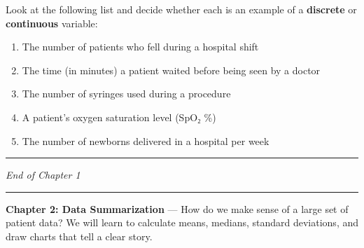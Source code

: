 \documentclass[
  12pt,
  letterpaper,
]{book}
\providecommand{\tightlist}{%
  \setlength{\itemsep}{0pt}\setlength{\parskip}{0pt}}
\begin{document}
\begin{tcolorbox}[enhanced jigsaw, arc=.35mm, bottomrule=.15mm, bottomtitle=1mm, breakable, colback=white, colbacktitle=quarto-callout-caution-color!10!white, colframe=quarto-callout-caution-color-frame, coltitle=black, left=2mm, leftrule=.75mm, opacityback=0, opacitybacktitle=0.6, rightrule=.15mm, title={✏️ Exercise 3}, titlerule=0mm, toprule=.15mm, toptitle=1mm]

Look at the following list and decide whether each is an example of a
\textbf{discrete} or \textbf{continuous} variable:

\begin{enumerate}
\def\labelenumi{\arabic{enumi}.}
\tightlist
\item
  The number of patients who fell during a hospital shift
\item
  The time (in minutes) a patient waited before being seen by a doctor
\item
  The number of syringes used during a procedure
\item
  A patient's oxygen saturation level (SpO₂ \%)
\item
  The number of newborns delivered in a hospital per week
\end{enumerate}

\end{tcolorbox}

\begin{center}\rule{0.5\linewidth}{0.5pt}\end{center}

\emph{End of Chapter 1}

\begin{center}\rule{0.5\linewidth}{0.5pt}\end{center}

\begin{tcolorbox}[enhanced jigsaw, arc=.35mm, bottomrule=.15mm, bottomtitle=1mm, breakable, colback=white, colbacktitle=quarto-callout-note-color!10!white, colframe=quarto-callout-note-color-frame, coltitle=black, left=2mm, leftrule=.75mm, opacityback=0, opacitybacktitle=0.6, rightrule=.15mm, title={📚 Coming Up Next}, titlerule=0mm, toprule=.15mm, toptitle=1mm]

\textbf{Chapter 2: Data Summarization} --- How do we make sense of a
large set of patient data? We will learn to calculate means, medians,
standard deviations, and draw charts that tell a clear story.

\end{tcolorbox}
\end{document}

